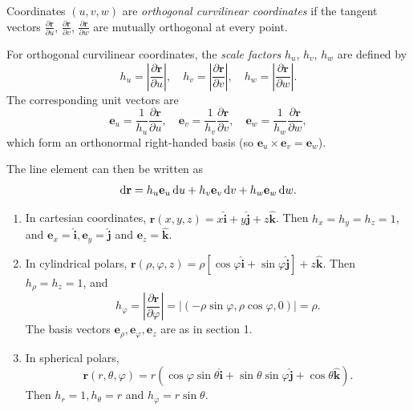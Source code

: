 \documentclass[a4paper]{article}
\begin{document}
\begin{defi}
  Coordinates $(u, v, w)$ are \emph{orthogonal curvilinear coordinates} if the tangent vectors $\frac{\partial \mathbf{r}}{\partial u}$, $\frac{\partial \mathbf{r}}{\partial v}$, $\frac{\partial \mathbf{r}}{\partial w}$ are mutually orthogonal at every point.
\end{defi}

\begin{defi}
  For orthogonal curvilinear coordinates, the \emph{scale factors} $h_u$, $h_v$, $h_w$ are defined by
  \[
    h_u = \left|\frac{\partial \mathbf{r}}{\partial u}\right|, \quad h_v = \left|\frac{\partial \mathbf{r}}{\partial v}\right|, \quad h_w = \left|\frac{\partial \mathbf{r}}{\partial w}\right|.
  \]
  The corresponding unit vectors are
  \[
    \mathbf{e}_u = \frac{1}{h_u}\frac{\partial \mathbf{r}}{\partial u}, \quad \mathbf{e}_v = \frac{1}{h_v}\frac{\partial \mathbf{r}}{\partial v}, \quad \mathbf{e}_w = \frac{1}{h_w}\frac{\partial \mathbf{r}}{\partial w},
  \]
  which form an orthonormal right-handed basis (so $\mathbf{e}_u \times \mathbf{e}_v = \mathbf{e}_w$).
\end{defi}

The line element can then be written as
\[
  \mathrm{d} \mathbf{r} = h_u \mathbf{e}_u \,\mathrm{d} u + h_v \mathbf{e}_v\,\mathrm{d} v + h_w\mathbf{e}_w \,\mathrm{d} w.
\]

\begin{eg}\leavevmode
  \begin{enumerate}
    \item In cartesian coordinates, $\mathbf{r}(x, y, z) = x\hat{\mathbf{i}} + y\hat{\mathbf{j}} + z\hat{\mathbf{k}}$. Then $h_x = h_y = h_z = 1$, and $\mathbf{e}_x = \hat{\mathbf{i}}, \mathbf{e}_y = \hat{\mathbf{j}}$ and $\mathbf{e}_z = \hat{\mathbf{k}}$.
    \item In cylindrical polars, $\mathbf{r}(\rho, \varphi, z) = \rho[\cos \varphi\hat{\mathbf{i}} + \sin \varphi \hat{\mathbf{j}}] + z \hat{\mathbf{k}}$. Then $h_\rho = h_z = 1$, and
      \[
        h_\varphi = \left|\frac{\partial \mathbf{r}}{\partial \varphi}\right| = |(-\rho \sin\varphi, \rho \cos \varphi, 0)| = \rho.
      \]
      The basis vectors $\mathbf{e}_\rho, \mathbf{e}_\varphi, \mathbf{e}_z$ are as in section 1.
    \item In spherical polars,
      \[
        \mathbf{r}(r, \theta, \varphi) = r(\cos \varphi\sin \theta\hat{\mathbf{i}} + \sin \theta\sin \varphi\hat{\mathbf{j}} + \cos \theta \hat{\mathbf{k}}).
      \]
      Then $h_r = 1, h_\theta = r$ and $h_\varphi = r\sin \theta$.
  \end{enumerate}
\end{eg}
\end{document}
